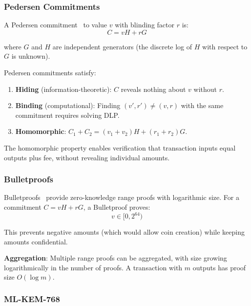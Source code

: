 \subsubsection{Pedersen Commitments}

A Pedersen commitment~\cite{pedersen} to value $v$ with blinding factor
$r$ is:
\begin{equation}
C = vH + rG
\end{equation}

where $G$ and $H$ are independent generators (the discrete log of $H$
with respect to $G$ is unknown).

\begin{theorem}
Pedersen commitments satisfy:
\begin{enumerate}
  \item \textbf{Hiding} (information-theoretic): $C$ reveals nothing
    about $v$ without $r$.
  \item \textbf{Binding} (computational): Finding $(v', r') \neq (v, r)$
    with the same commitment requires solving DLP.
  \item \textbf{Homomorphic}: $C_1 + C_2 = (v_1 + v_2)H + (r_1 + r_2)G$.
\end{enumerate}
\end{theorem}

The homomorphic property enables verification that transaction inputs
equal outputs plus fee, without revealing individual amounts.

\subsubsection{Bulletproofs}

Bulletproofs~\cite{bulletproofs} provide zero-knowledge range proofs with
logarithmic size. For a commitment $C = vH + rG$, a Bulletproof proves:
\begin{equation}
v \in [0, 2^{64})
\end{equation}

This prevents negative amounts (which would allow coin creation) while
keeping amounts confidential.

\textbf{Aggregation}: Multiple range proofs can be aggregated, with size
growing logarithmically in the number of proofs. A transaction with $m$
outputs has proof size $O(\log m)$.

\subsubsection{ML-KEM-768}

